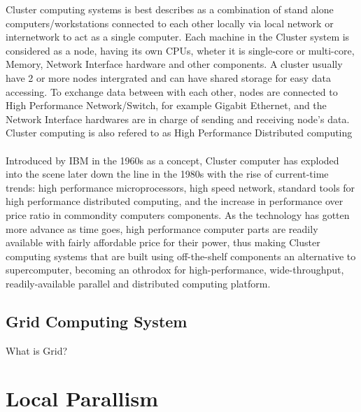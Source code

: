 Cluster computing systems is best describes as a combination of stand alone computers/workstations connected to each other locally via local network or internetwork to act as a single computer. Each machine in the Cluster system is considered as a node, having its own CPUs, wheter it is single-core or multi-core, Memory, Network Interface hardware and other components. A cluster usually have 2 or more nodes intergrated and can have shared storage for easy data accessing. To exchange data between with each other, nodes are connected to High Performance Network/Switch, for example Gigabit Ethernet, and the Network Interface hardwares are in charge of sending and receiving node's data. Cluster computing is also refered to as High Performance Distributed computing\\
~\\
Introduced by IBM in the 1960s as a concept, Cluster computer has exploded into the scene later down the line in the 1980s with the rise of current-time trends: high performance microprocessors, high speed network, standard tools for high performance distributed computing, and the increase in performance over price ratio in commondity computers components. As the technology has gotten more advance as time goes, high performance computer parts are readily available with fairly affordable price for their power, thus making Cluster computing systems that are built using off-the-shelf components an alternative to supercomputer, becoming an othrodox for high-performance, wide-throughput, readily-available parallel and distributed computing platform.

\subsection{Grid Computing System}

What is Grid?

\section{Local Parallism}

